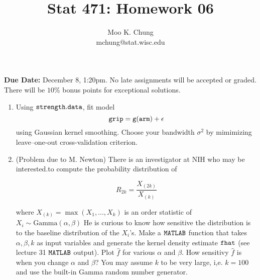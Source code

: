 \documentclass[12pt]{article} %
\begin{document}
\title{Stat 471: Homework 06 }
\author{Moo K. Chung\\
mchung@stat.wisc.edu}
\maketitle \thispagestyle{empty}

{\bf Due Date:} December 8, 1:20pm. No late assignments will be
accepted or graded. There will be $10\%$ bonus points for
exceptional solutions.


\begin{enumerate}

\item Using $\tt{strength.data}$, fit model
$$\tt{grip} = g(\tt{arm}) + \epsilon$$
using Gaussian kernel smoothing. Choose your bandwidth $\sigma^2$ by mimimizing leave--one-out cross-validation criterion. 

\item  (Problem due to M. Newton) There is an investigator at NIH who may be interested.to compute the probability distribution of

$$ R_{2k} =  \frac{X_{(2k)}}{X_{(k)}}        $$

where $X_{(k)} = \max (X_1,...,X_k)$ is an order statistic of $X_i \sim \mbox{Gamma}(\alpha,\beta)$
He is curious to know how sensitive the distribution is to the baseline distribution of the $X_i$'s. Make a $\tt{MATLAB}$ function that takes $\alpha,\beta,k$ as input variables and generate the kernel density estimate $\tt{fhat}$ (see lecture 31 $\tt{MATLAB}$ output). Plot $\hat f$ for various $\alpha$ and $\beta$. How sensitivy $\hat f$ is when you change $\alpha$ and $\beta$? You may assume $k$ to be very large, i,e. $k=100$ and use the built-in Gamma random number generator.

\end{enumerate}
\end{document}
